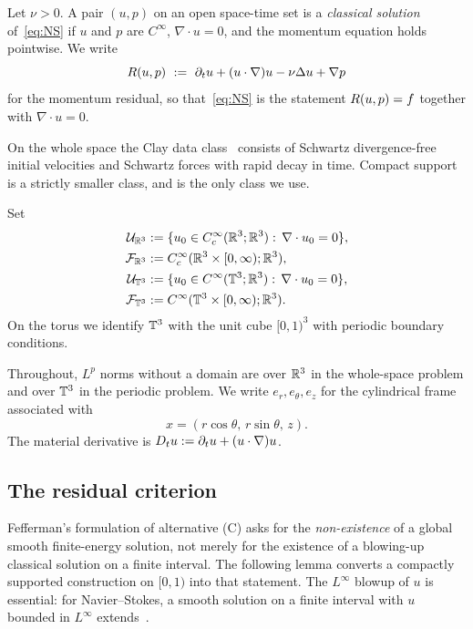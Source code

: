 Let $\nu>0$. A pair $(u,p)$ on an open space-time set is a \emph{classical solution} of~\eqref{eq:NS} if $u$ and $p$ are $C^\infty$, $\nabla\cdot u=0$, and the momentum equation holds pointwise. We write
\[
R(u,p)\ :=\ \partial_t u+(u\cdot\nabla)u-\nu\Delta u+\nabla p
\]
for the momentum residual, so that~\eqref{eq:NS} is the statement $R(u,p)=f$ together with $\nabla\cdot u=0$.

On the whole space the {C}lay data class~\cite{fefferman2000} consists of Schwartz divergence-free initial velocities and Schwartz forces with rapid decay in time. Compact support is a strictly smaller class, and is the only class we use.

\begin{definition}
\label{def:data}
Set
\begin{align*}
\mathcal U_{\mathbb{R}^3}
&:=\{u_0\in C_c^\infty(\mathbb{R}^3;\mathbb{R}^3):\,\nabla\cdot u_0=0\},\\
\mathcal F_{\mathbb{R}^3}
&:=C_c^\infty(\mathbb{R}^3\times[0,\infty);\mathbb{R}^3),\\
\mathcal U_{\mathbb{T}^3}
&:=\{u_0\in C^\infty(\mathbb{T}^3;\mathbb{R}^3):\,\nabla\cdot u_0=0\},\\
\mathcal F_{\mathbb{T}^3}
&:=C^\infty(\mathbb{T}^3\times[0,\infty);\mathbb{R}^3).
\end{align*}
On the torus we identify $\mathbb{T}^3$ with the unit cube $[0,1)^3$ with periodic boundary conditions.
\end{definition}

\begin{notation}
Throughout, $L^p$ norms without a domain are over $\mathbb{R}^3$ in the whole-space problem and over $\mathbb{T}^3$ in the periodic problem. We write $e_r,e_\theta,e_z$ for the cylindrical frame associated with
\[
x=(r\cos\theta,\, r\sin\theta,\, z).
\]
The material derivative is $D_t u:=\partial_t u+(u\cdot\nabla)u$.
\end{notation}

\subsection{The residual criterion}

{F}efferman's formulation of alternative (C) asks for the \emph{non-existence} of a global smooth finite-energy solution, not merely for the existence of a blowing-up classical solution on a finite interval. The following lemma converts a compactly supported construction on $[0,1)$ into that statement. The $L^\infty$ blowup of $u$ is essential: for {N}avier--{S}tokes, a smooth solution on a finite interval with $u$ bounded in $L^\infty$ extends~\cite{kato1972,fefferman2000}.

